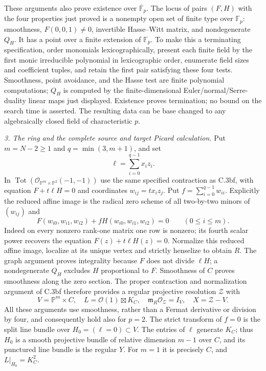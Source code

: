 These arguments also prove existence over $\overline{\mathbb F}_p$.
The locus of pairs $(F,H)$ with the four properties just proved is a
nonempty open set of finite type over $\mathbb F_p$: smoothness,
$F(0,0,1)\ne0$, invertible Hasse--Witt matrix, and nondegenerate
$Q_H$. It has a point over a finite extension of $\mathbb F_p$.
To make this a terminating specification, order monomials lexicographically,
present each finite field by the first monic irreducible polynomial in
lexicographic order, enumerate field sizes and coefficient tuples, and retain the first pair
satisfying these four tests. Smoothness, point avoidance, and the Hasse test are finite polynomial computations; $Q_H$ is computed
by the finite-dimensional Euler/normal/Serre-duality linear maps
just displayed. Existence proves termination; no bound on the
search time is asserted. The resulting data can be base changed
to any algebraically closed field of characteristic $p$.

\emph{3. The ring and the complete source and target Picard calculation.}
Put $m=N-2\ge1$ and $q=\min(3,m+1)$, and set
\[
 \ell=\sum_{i=0}^{q-1}x_i z_i.
\]
In $\operatorname{Tot}(\mathcal O_{\mathbb P^m\times\mathbb P^2}(-1,-1))$
use the same specified contraction as C.3bf, with equation
$F+t\ell H=0$ and coordinates $w_{ij}=tx_i z_j$. Put $f=\sum_{i=0}^{q-1}w_{ii}$. Explicitly the reduced affine image
is the radical zero scheme of all two-by-two minors of $(w_{ij})$ and
\[
 F(w_{i0},w_{i1},w_{i2})+
       fH(w_{i0},w_{i1},w_{i2})=0\qquad(0\le i\le m).
\]
Indeed on every nonzero rank-one matrix one row is nonzero; its
fourth scalar power recovers the equation $F(z)+t\ell H(z)=0$.
Normalize this reduced affine image, localize at its unique vertex
and strictly henselize to obtain $R$.
The graph argument proves integrality because $F$ does not divide
$\ell H$; a nondegenerate $Q_H$ excludes $H$ proportional to $F$.
Smoothness of $C$ proves smoothness along the zero section. The
proper contraction and normalization argument of C.3bf therefore
provides a regular projective resolution $\mathcal Z$ with
\[
 V=\mathbb P^m\times C,\quad
 L=\mathcal O(1)\boxtimes K_C,\quad
 \mathfrak m_R\mathcal O_{\mathcal Z}=I_V,\quad X=\mathcal Z-V.
\]
All these arguments use smoothness, rather than a Fermat derivative
or division by four, and consequently hold also for $p=2$.
The strict transform of $f=0$ is the split line bundle over
$H_0=(\ell=0)\subset V$. The entries of $\ell$ generate $K_C$;
thus $H_0$ is a smooth projective bundle of relative dimension $m-1$
over $C$, and its punctured line bundle is the regular $Y$.
For $m=1$ it is precisely $C$, and $L|_{H_0}=K_C^2$.

